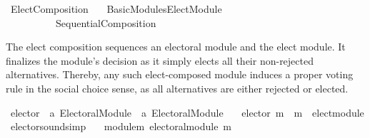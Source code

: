 %
\begin{isabellebody}%
%
%
\isadelimdocument
\isanewline
%
\endisadelimdocument
%
\isatagdocument
\isanewline
\isanewline
%
\isamarkuptrue%
%
\endisatagdocument
{\isafolddocument}%
%
\isadelimdocument
%
\endisadelimdocument
%
\isadelimtheory
%
\endisadelimtheory
%
\isatagtheory
{}\isamarkupfalse%
\ Elect{\isacharunderscore}{\kern0pt}Composition\isanewline
\ \ \ {\isachardoublequoteopen}Basic{\isacharunderscore}{\kern0pt}Modules{\isacharslash}{\kern0pt}Elect{\isacharunderscore}{\kern0pt}Module{\isachardoublequoteclose}\isanewline
\ \ \ \ \ \ \ \ \ \ Sequential{\isacharunderscore}{\kern0pt}Composition\isanewline
{}%
\endisatagtheory
{\isafoldtheory}%
%
\isadelimtheory
%
\endisadelimtheory
%
\begin{isamarkuptext}%
The elect composition sequences an electoral module and the elect
module. It finalizes the module's decision as it simply elects all their
non-rejected alternatives. Thereby, any such elect-composed module induces
a proper voting rule in the social choice sense, as all alternatives are either
rejected or elected.%
\end{isamarkuptext}\isamarkuptrue%
%
\isadelimdocument
%
\endisadelimdocument
%
\isatagdocument
%
\isamarkuptrue%
%
\endisatagdocument
{\isafolddocument}%
%
\isadelimdocument
%
\endisadelimdocument
{}\isamarkupfalse%
\ elector\ {\isacharcolon}{\kern0pt}{\isacharcolon}{\kern0pt}\ {\isachardoublequoteopen}{\isacharprime}{\kern0pt}a\ Electoral{\isacharunderscore}{\kern0pt}Module\ {\isasymRightarrow}\ {\isacharprime}{\kern0pt}a\ Electoral{\isacharunderscore}{\kern0pt}Module{\isachardoublequoteclose}\ \isanewline
\ \ {\isachardoublequoteopen}elector\ m\ {\isacharequal}{\kern0pt}\ {\isacharparenleft}{\kern0pt}m\ {\isasymtriangleright}\ elect{\isacharunderscore}{\kern0pt}module{\isacharparenright}{\kern0pt}{\isachardoublequoteclose}%
\isadelimdocument
%
\endisadelimdocument
%
\isatagdocument
%
\isamarkuptrue%
%
\endisatagdocument
{\isafolddocument}%
%
\isadelimdocument
%
\endisadelimdocument
{}\isamarkupfalse%
\ elector{\isacharunderscore}{\kern0pt}sound{\isacharbrackleft}{\kern0pt}simp{\isacharbrackright}{\kern0pt}{\isacharcolon}{\kern0pt}\isanewline
\ \ \ module{\isacharunderscore}{\kern0pt}m{\isacharcolon}{\kern0pt}\ {\isachardoublequoteopen}electoral{\isacharunderscore}{\kern0pt}module\ m{\isachardoublequoteclose}\isanewline

\end{isabellebody}
